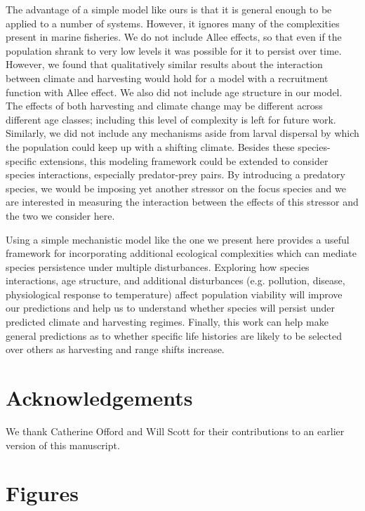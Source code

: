 \documentclass[12pt,english]{article}
\begin{document}
\begin{spacing}{1.9}
\begin{flushleft}
The advantage of a simple model like ours is that it is general enough to be applied to a number of systems.  However, it  ignores many of the complexities present in marine fisheries. We do not include Allee effects, so that even if the population shrank to very low levels it was possible for it to persist over time. However, we found that qualitatively similar results about the interaction between climate and harvesting would hold for a model with a recruitment function with Allee effect. We also did not include age structure in our model. The effects of both harvesting and climate change may be different across different age classes; including this level of complexity is left for future work. Similarly, we did not include any mechanisms aside from larval dispersal by which the population could keep up with a shifting climate.  Besides these species-specific extensions, this modeling framework could be extended to consider species interactions, especially predator-prey pairs.  By introducing a predatory species, we would be imposing yet another stressor on the focus species \citep{Lingetal2009, Gurevitchetal2000}and we are interested in measuring the interaction between the effects of this stressor and the two we consider here.

Using a simple mechanistic model like the one we present here provides a useful framework for incorporating additional ecological complexities which can mediate species persistence under multiple disturbances. Exploring how species interactions, age structure, and additional disturbances (e.g. pollution, disease, physiological response to temperature) affect population viability will improve our predictions and help us to understand whether species will persist under predicted climate and harvesting regimes. Finally, this work can help make general predictions as to whether specific life histories are likely to be selected over others as harvesting and range shifts increase.


\section*{ Acknowledgements}
We thank Catherine Offord and Will Scott for their contributions to an earlier version of this manuscript. 

\end{flushleft}
\end{spacing}


\pagebreak
\section{Figures}
\end{document}
